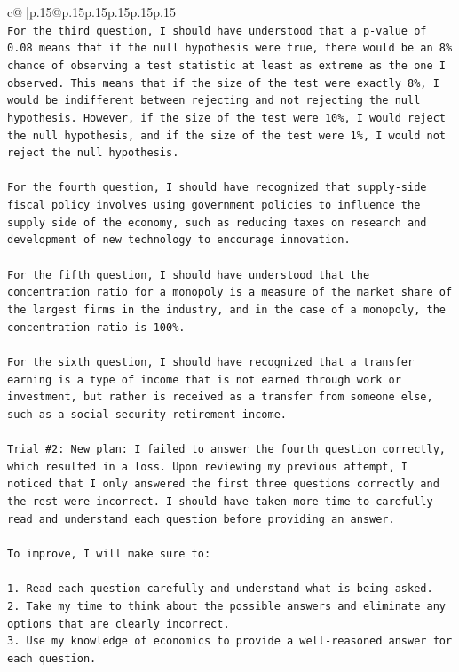\documentclass{article}
\begin{document}
{\begin{supertabular}{c@{$\;$}|p{.15\linewidth}@{}p{.15\linewidth}p{.15\linewidth}p{.15\linewidth}p{.15\linewidth}p{.15\linewidth}}
{{{\\ 
\texttt{For the third question, I should have understood that a p{-}value of 0.08 means that if the null hypothesis were true, there would be an 8\% chance of observing a test statistic at least as extreme as the one I observed. This means that if the size of the test were exactly 8\%, I would be indifferent between rejecting and not rejecting the null hypothesis. However, if the size of the test were 10\%, I would reject the null hypothesis, and if the size of the test were 1\%, I would not reject the null hypothesis.} \\
\\ 
\texttt{For the fourth question, I should have recognized that supply{-}side fiscal policy involves using government policies to influence the supply side of the economy, such as reducing taxes on research and development of new technology to encourage innovation.} \\
\\ 
\texttt{For the fifth question, I should have understood that the concentration ratio for a monopoly is a measure of the market share of the largest firms in the industry, and in the case of a monopoly, the concentration ratio is 100\%.} \\
\\ 
\texttt{For the sixth question, I should have recognized that a transfer earning is a type of income that is not earned through work or investment, but rather is received as a transfer from someone else, such as a social security retirement income.} \\
\\ 
\texttt{Trial \#2: New plan: I failed to answer the fourth question correctly, which resulted in a loss. Upon reviewing my previous attempt, I noticed that I only answered the first three questions correctly and the rest were incorrect. I should have taken more time to carefully read and understand each question before providing an answer. } \\
\\ 
\texttt{To improve, I will make sure to:} \\
\\ 
\texttt{1. Read each question carefully and understand what is being asked.} \\
\texttt{2. Take my time to think about the possible answers and eliminate any options that are clearly incorrect.} \\
\texttt{3. Use my knowledge of economics to provide a well{-}reasoned answer for each question.} \\
}}}
\end{supertabular}}
\end{document}
